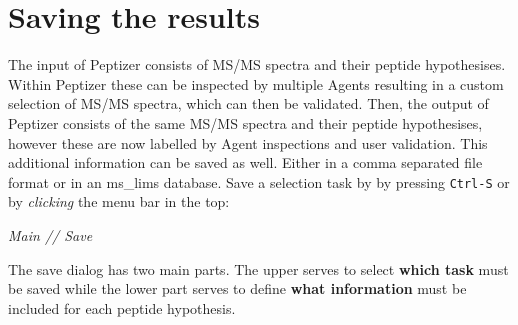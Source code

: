 \section{Saving the results}
\npar The input of Peptizer consists of MS/MS spectra and their peptide hypothesises. Within Peptizer these can be inspected by multiple Agents resulting in a custom selection of MS/MS spectra, which can then be validated. Then, the output of Peptizer consists of the same MS/MS spectra and their peptide hypothesises, however these are now labelled by Agent inspections and user validation. This additional information can be saved as well. Either in a comma separated file format or in an ms\_lims database.
\npar Save a selection task by by pressing \verb!Ctrl-S! or by \textit{clicking }the menu bar in the top:
% 
\begin{center}
\textit{Main // Save}	
\end{center}
%
\npar The save dialog has two main parts. The upper serves to select \textbf{which task} must be saved while the lower part serves to define \textbf{what information} must be included for each peptide hypothesis.
